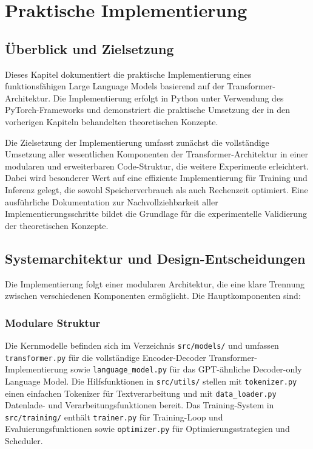 \chapter{Praktische Implementierung}
\label{ch:implementation}

\section{Überblick und Zielsetzung}

Dieses Kapitel dokumentiert die praktische Implementierung eines funktionsfähigen Large Language Models basierend auf der Transformer-Architektur. Die Implementierung erfolgt in Python unter Verwendung des PyTorch-Frameworks und demonstriert die praktische Umsetzung der in den vorherigen Kapiteln behandelten theoretischen Konzepte.

Die Zielsetzung der Implementierung umfasst zunächst die vollständige Umsetzung aller wesentlichen Komponenten der Transformer-Architektur in einer modularen und erweiterbaren Code-Struktur, die weitere Experimente erleichtert. Dabei wird besonderer Wert auf eine effiziente Implementierung für Training und Inferenz gelegt, die sowohl Speicherverbrauch als auch Rechenzeit optimiert. Eine ausführliche Dokumentation zur Nachvollziehbarkeit aller Implementierungsschritte bildet die Grundlage für die experimentelle Validierung der theoretischen Konzepte.

\section{Systemarchitektur und Design-Entscheidungen}

Die Implementierung folgt einer modularen Architektur, die eine klare Trennung zwischen verschiedenen Komponenten ermöglicht. Die Hauptkomponenten sind:

\subsection{Modulare Struktur}

Die Kernmodelle befinden sich im Verzeichnis \texttt{src/models/} und umfassen \texttt{transformer.py} für die vollständige Encoder-Decoder Transformer-Implementierung sowie \texttt{language\_model.py} für das GPT-ähnliche Decoder-only Language Model. Die Hilfsfunktionen in \texttt{src/utils/} stellen mit \texttt{tokenizer.py} einen einfachen Tokenizer für Textverarbeitung und mit \texttt{data\_loader.py} Datenlade- und Verarbeitungsfunktionen bereit. Das Training-System in \texttt{src/training/} enthält \texttt{trainer.py} für Training-Loop und Evaluierungsfunktionen sowie \texttt{optimizer.py} für Optimierungsstrategien und Scheduler.

